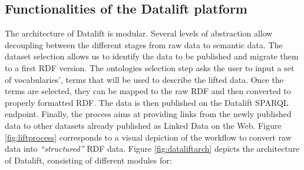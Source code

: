 \subsection{Functionalities of the Datalift platform}
The architecture of Datalift is modular. Several levels of abstraction allow decoupling between the different stages from raw data to semantic data. The dataset selection allows us to identify the data to be published and migrate them to a first RDF version. The ontologies selection step asks the user to input a set of vocabularies', terms that will be used to describe the lifted data. Once the terms are selected, they can be mapped to the raw RDF and then converted to properly formatted RDF. The data is then published on the Datalift SPARQL endpoint. Finally, the process aims at providing links from the newly published data to other datasets already published as Linked Data on the Web. Figure \ref{fig:liftprocess} corresponds to a visual depiction of the workflow to convert raw data into \textit{``structured''} RDF data. Figure \ref{fig:dataliftarch} depicts the architecture of Datalift, consisting of different modules for:

\begin{figure}[ht!b]
\end{figure}

